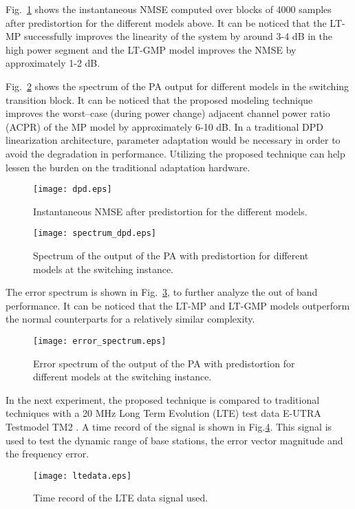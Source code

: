 \documentclass[journal]{IEEEtran}
\begin{document}
Fig.~\ref{dpd} shows the instantaneous NMSE computed over blocks of 4000 samples after  predistortion for the different models above. It can be noticed that the LT-MP successfully improves the linearity of the system by around 3-4 dB in the high power segment and the LT-GMP model improves the NMSE by approximately 1-2 dB.

Fig.~\ref{spectrum_dpd} shows the spectrum of the PA output for different models in the switching transition block. It can be noticed that the proposed modeling technique improves the worst--case (during power change) adjacent channel power ratio (ACPR) of the MP model by approximately 6-10 dB. In a traditional DPD linearization architecture, parameter adaptation would be necessary in order to avoid the degradation in performance. Utilizing the proposed technique can help lessen the burden on the traditional adaptation hardware.
\begin{figure}
\centering
\texttt{[image: dpd.eps]}
\caption{Instantaneous NMSE after predistortion for the different models.} \label{dpd}
\end{figure}

\begin{figure}
\centering
\texttt{[image: spectrum\_dpd.eps]}
\caption{Spectrum of the output of the PA with predistortion for different models at the switching instance.} \label{spectrum_dpd}
\end{figure}

The error spectrum is shown in Fig.~\ref{error_spectrum}, to further analyze the out of band performance. It can be noticed that the LT-MP and LT-GMP models outperform the normal counterparts for a relatively similar complexity.
\begin{figure}
\centering
\texttt{[image: error\_spectrum.eps]}
\caption{Error spectrum of the output of the PA with predistortion for different models at the switching instance.} \label{error_spectrum}
\end{figure}

In the next experiment, the proposed technique is compared to traditional techniques with a 20 MHz 
Long Term Evolution (LTE) test data E-UTRA Testmodel TM2 \cite{3gpp}. A time record of the signal is shown in
Fig.\ref{ltedata}. This signal is used to test the dynamic range of base stations, the error vector magnitude 
and the frequency error.
\begin{figure}
\centering
\texttt{[image: ltedata.eps]}
\caption{Time record of the LTE data signal used.} \label{ltedata}
\end{figure}
\end{document}
